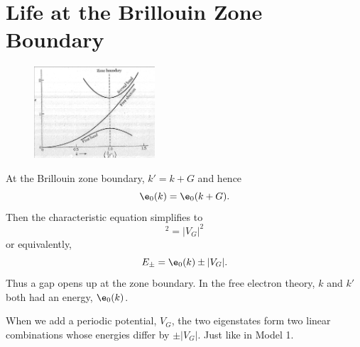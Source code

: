 \documentclass[a4paper, 11pt, normalem]{report}
\begin{document}
\section{Life at the Brillouin Zone Boundary}
\begin{figure}
    \centering
    \includegraphics[width=0.4\textwidth]{boundary.png}
\end{figure}
At the Brillouin zone boundary, $k' = k+G$ and hence
\begin{equation}
    \e_0(k) = \e_0(k+G).
\end{equation}
Then the characteristic equation simplifies to
\begin{equation}
    [\e_0(k) - E]^2 = |V_G|^2
\end{equation}
or equivalently,
\begin{equation}
    E_{\pm} = \e_0(k) \pm |V_G|.
\end{equation}
Thus a gap opens up at the zone boundary. 
In the free electron theory, $k$ and $k'$ both had an energy, $\e_0(k)$. 

When we add a periodic potential, $V_G$, the two eigenstates form two linear combinations whose energies differ by $\pm |V_G|$.
Just like in Model 1.
\end{document}
